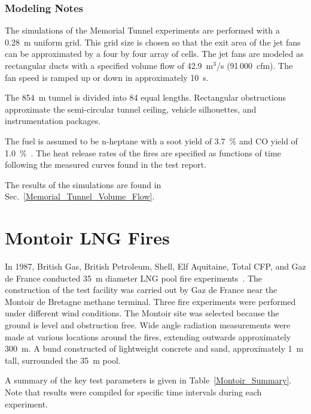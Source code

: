 \subsubsection{Modeling Notes}

The simulations of the Memorial Tunnel experiments are performed with a 0.28~m uniform grid. This grid size is chosen so that the exit area of the jet fans can be approximated by a four by four array of cells. The jet fans are modeled as rectangular ducts with a specified volume flow of 42.9~m$^3$/s (91\,000~cfm). The fan speed is ramped up or down in approximately 10~s.

The 854~m tunnel is divided into 84 equal lengths. Rectangular obstructions approximate the semi-circular tunnel ceiling, vehicle silhouettes, and instrumentation packages.

The fuel is assumed to be n-heptane with a soot yield of 3.7~\% and CO yield of 1.0~\%~\cite{SFPE:Tewarson}. The heat release rates of the fires are specified as functions of time following the measured curves found in the test report.

The results of the simulations are found in Sec.~\ref{Memorial_Tunnel_Volume_Flow}.


\section{Montoir LNG Fires}
\label{Montoir_LNG_Fires_Description}

In 1987, British Gas, British Petroleum, Shell, Elf Aquitaine, Total CFP, and Gaz de France conducted 35~m diameter LNG pool fire experiments~\cite{Nedelka:1990}. The construction of the test facility was carried out by Gaz de France near the Montoir de Bretagne methane terminal. Three fire experiments were performed under different wind conditions. The Montoir site was selected because the ground is level and obstruction free. Wide angle radiation measurements were made at various locations around the fires, extending outwards approximately 300~m. A bund constructed of lightweight concrete and sand, approximately 1~m tall, surrounded the 35~m pool. 

A summary of the key test parameters is given in Table~\ref{Montoir_Summary}. Note that results were compiled for specific time intervals during each experiment.

